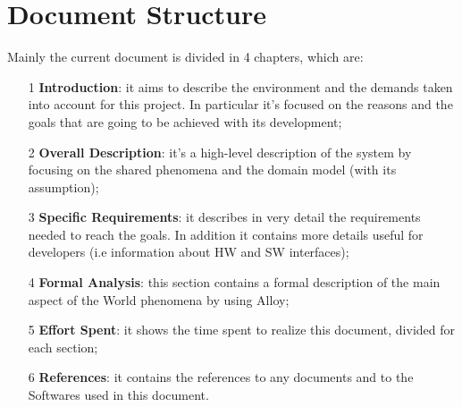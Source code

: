 \section{Document Structure}
Mainly the current document is divided in 4 chapters, which are:
\begin{itemize}
\item[1]\textbf{Introduction}: it aims to describe the environment and the demands taken into account for this project. In particular it's focused on the reasons and the goals that are going to be achieved with its development;
\item[2]\textbf{Overall Description}: it's a high-level description of the system by focusing on the shared phenomena and the domain model (with its assumption); 
\item[3]\textbf{Specific Requirements}: it describes in very detail the requirements needed to reach the goals. In addition it contains more details useful for developers (i.e information about HW and SW interfaces);
\item[4]\textbf{Formal Analysis}: this section contains a formal description of the main aspect of the World phenomena by using Alloy;
\item[5]\textbf{Effort Spent}: it shows the time spent to realize this document, divided for each section;
\item[6]\textbf{References}: it contains the references to any documents and to the Softwares used in this document.
\end{itemize}

